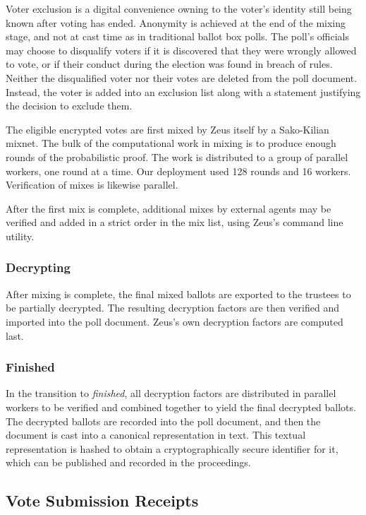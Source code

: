 \documentclass[letterpaper,10pt]{article}
\begin{document}
Voter exclusion is a digital convenience owning to
the voter's identity still being known after voting has ended.
Anonymity is achieved at the end of the mixing stage,
and not at cast time as in traditional ballot box polls.
The poll's officials may choose to disqualify voters if
it is discovered that they were wrongly allowed to vote, or if
their conduct during the election was found in breach of rules.
Neither the disqualified voter nor their votes are deleted from 
the poll document. Instead, the voter is added into an exclusion 
list along with a statement justifying the decision to exclude them.

The eligible encrypted votes are first mixed by Zeus itself
by a Sako-Kilian mixnet.
The bulk of the computational work in mixing is to produce
enough rounds of the probabilistic proof.
The work is distributed to a group of parallel workers,
one round at a time. Our deployment used 128 rounds and 16 workers.
Verification of mixes is likewise parallel.

After the first mix is complete, additional mixes by external agents
may be verified and added in a strict order in the mix list, using
Zeus's command line utility.

\subsubsection{Decrypting}
\label{sec:decrypting}

After mixing is complete, the final mixed ballots are exported to
the trustees to be partially decrypted.
The resulting decryption factors are then verified and imported
into the poll document.
Zeus's own decryption factors are computed last.

\subsubsection{Finished}
\label{sec:finished}
In the transition to \emph{finished}, all decryption factors are
distributed in parallel workers to be verified and combined together
to yield the final decrypted ballots.
The decrypted ballots are recorded into the poll document,
and then the document is cast into a canonical representation in text.
This textual representation is hashed to obtain a cryptographically
secure identifier for it, which can be published and recorded
in the proceedings.

\subsection{Vote Submission Receipts}
\label{sec:receipts}
\end{document}
